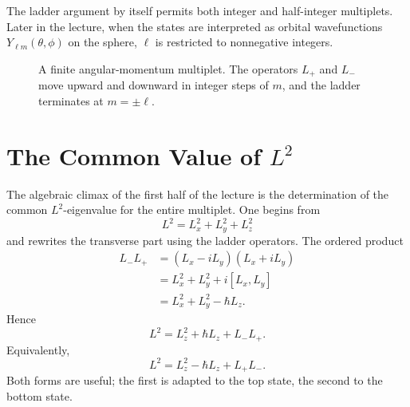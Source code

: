 \begin{remark}
The ladder argument by itself permits both integer and half-integer multiplets. Later in the lecture, when the states are interpreted as orbital wavefunctions \(Y_{\ell m}(\theta,\phi)\) on the sphere, \(\ell\) is restricted to nonnegative integers.
\end{remark}

\begin{figure}
\centering
{}
\caption{A finite angular-momentum multiplet. The operators \(L_+\) and \(L_-\) move upward and downward in integer steps of \(m\), and the ladder terminates at \(m=\pm \ell\).}
\end{figure}

\section{The Common Value of \(L^2\)}

The algebraic climax of the first half of the lecture is the determination of the common \(L^2\)-eigenvalue for the entire multiplet. One begins from
\begin{equation}
L^2=L_x^2+L_y^2+L_z^2
\end{equation}
and rewrites the transverse part using the ladder operators. The ordered product
\begin{align}
L_-L_+&=(L_x-iL_y)(L_x+iL_y) \\
&=L_x^2+L_y^2+i[L_x,L_y] \\
&=L_x^2+L_y^2-\hbar L_z.
\end{align}
Hence
\begin{equation}
L^2=L_z^2+\hbar L_z+L_-L_+.
\end{equation}
Equivalently,
\begin{equation}
L^2=L_z^2-\hbar L_z+L_+L_-.
\end{equation}
Both forms are useful; the first is adapted to the top state, the second to the bottom state.

